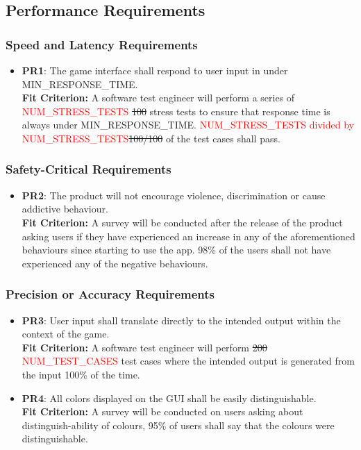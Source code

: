\documentclass[12pt, titlepage]{article}
\begin{document}
\subsection{Performance Requirements}
\subsubsection{Speed and Latency Requirements}
\begin{itemize}
\item \textbf{PR1}: The game interface shall respond to user input in under MIN\_RESPONSE\_TIME.\\
\textbf{Fit Criterion:} A software test engineer will perform a series of \textcolor{red}{NUM\_STRESS\_TESTS} \sout{100} stress tests to ensure that response time is always under MIN\_RESPONSE\_TIME. \textcolor{red}{NUM\_STRESS\_TESTS divided by NUM\_STRESS\_TESTS}\sout{100/100} of the test cases shall pass.
\end{itemize}

\subsubsection{Safety-Critical Requirements}
\begin{itemize}
\item \textbf{PR2}: The product will not encourage violence, discrimination or cause addictive behaviour. \\
\textbf{Fit Criterion:} A survey will be conducted after the release of the product asking users if they have experienced an increase in any of the aforementioned behaviours since starting to use the app. 98\% of the users shall not have experienced any of the negative behaviours.
\end{itemize}

\subsubsection{Precision or Accuracy Requirements}
\begin{itemize}
\item \textbf{PR3}: User input shall translate directly to the intended output within the context of the game.\\
\textbf{Fit Criterion:} A software test engineer will perform \sout{200} \textcolor{red}{NUM\_TEST\_CASES} test cases where the intended output is generated from the input 100\% of the time.
\item \textbf{PR4}: All colors displayed on the GUI shall be easily distinguishable.\\
\textbf{Fit Criterion:} A survey will be conducted on users asking about distinguish-ability of colours, 95\% of users shall say that the colours were distinguishable.
\end{itemize}
\end{document}

